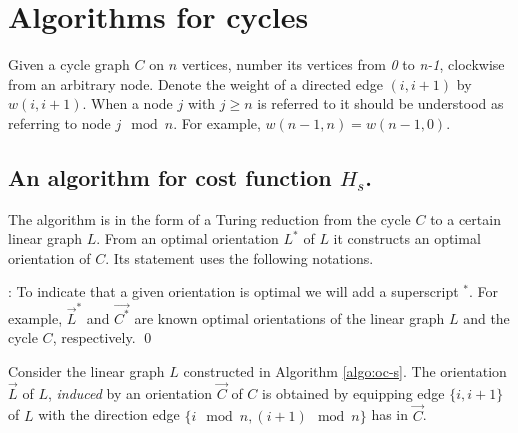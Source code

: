 \section{Algorithms for cycles}\label{s.c}
Given a cycle graph $C$ on $n$ vertices, number its vertices from \textit{0} to \textit{n-1}, 
clockwise from an arbitrary node. 
Denote the weight of a directed
edge $(i,i+1)$ by $w(i,i+1)$. When a node $j$ with $j\geq n$ is referred to it 
should be understood as referring to node $j \mod n$. 
For example, $w(n-1,n)=w(n-1,0)$.

\subsection{An algorithm for cost function $H_s$.}

The algorithm is in the form of a Turing reduction from the cycle $C$ to a certain linear graph
$L$. From an optimal orientation $L^*$ of $L$ it constructs an optimal orientation of $C$.
Its statement uses the following notations.

: To indicate that a given orientation is optimal 
we will add a superscript $^*$.
For example, $\vec{L}^*$ and $\vec{C^*}$ are known optimal orientations of 
the linear graph $L$ and the cycle $C$,
respectively.
\qed
\begin{definition}
	Consider the linear graph $L$ constructed in Algorithm \ref{algo:oc-s}. 
	The orientation $\vec{L}$ of $L$, \emph{induced} by an orientation $\vec{C}$ 
	of $C$ is obtained by equipping edge $\{i,i+1\}$ of $L$ with the direction edge
    $\{i \mod n, (i+1) \mod n\}$ has in $\vec{C}$.
\end{definition}

